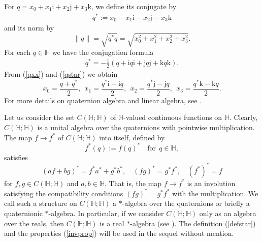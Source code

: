 \documentclass[11pt,a4paper]{amsart}
\theoremstyle{definition}
\begin{document}
For
$q = x_{0} + x_{1} \mathrm{i}+ x_{2} \mathrm{j}+ x_{3} \mathrm{k}$, we
define its conjugate by
%
\begin{align}
\label{qstar}
q^{*}:=x_{0}-x_{1}\mathrm{i}-x_{2}\mathrm{j}-x_{3}\mathrm{k}
\end{align}
%
and its norm by
%
\begin{equation*}
\|q\|=\sqrt{q^{*}q}=\sqrt{x_{0}^{2}+x_{1}^{2}+x_{2}^{2}+x_{3}^{2}}.
\end{equation*}
%
For each $q\in \mathbb{H}$ we have the conjugation formula
%
\begin{align}
\label{conjugationformula}
q^{*}=-\frac{1}{2}(q+\mathrm{i}q \mathrm{i}+\mathrm{j}q\mathrm{j}+
\mathrm{k}q\mathrm{k}).
\end{align}
%
From (\ref{qxx}) and (\ref{qstar}) we obtain
%
\begin{equation}
\label{coordinates}
x_{0} = \frac{q + q^{*}}{2},~~ x_{1} =
\frac{q^{*}\mathrm{i}- \mathrm{i}q}{2},~~ x_{2} =
\frac{q^{*}\mathrm{j}-\mathrm{j}q}{2},~~ x_{3} =
\frac{q^{*}\mathrm{k}- \mathrm{k}q}{2}.
\end{equation}
%
For more details on quaternion algebra and linear algebra, see
\cite{rodman2014}.

Let us consider the set $C(\mathbb{H}; \mathbb{H})$ of $\mathbb{H}$-valued
continuous functions on $\mathbb{H}$. Clearly,
$C(\mathbb{H};\mathbb{H})$ is a unital algebra over the quaternions with
pointwise multiplication. The map $f\to f^{*}$ of
$C(\mathbb{H}; \mathbb{H})$ into itself, defined by
%
\begin{equation}
\label{defstar}
f^{*}(q):= f(q)^{*}\quad \text{for}~~ q\in \mathbb{H},
\end{equation}
%
satisfies
%
\begin{equation}
\label{invprop}
(af+bg)^{*}=f^{*}a^{*}+g^{*}b^{*},\quad (fg)^{*}=g^{*}f^{*}, \quad (f^{*})^{*}=f
\end{equation}
%
for $f,g\in C(\mathbb{H}; \mathbb{H})$ and $a,b\in \mathbb{H}$. That is,
the map $f\to f^{*}$ is an involution satisfying the compatibility conditions
$(fg)^{*}=g^{*}f^{*}$ with the multiplication. We call such a structure
on $C(\mathbb{H}; \mathbb{H})$ a $*$-algebra over the quaternions or briefly
a quaternionic $*$-algebra. In particular, if we consider
$C(\mathbb{H}; \mathbb{H})$ only as an algebra over the reals, then
$C(\mathbb{H}; \mathbb{H})$ is a real $*$-algebra (see
\cite[Definition 2.1]{Schmudgen2020}). The definition (\ref{defstar}) and
the properties (\ref{invprop}) will be used in the sequel without mention.
\end{document}
